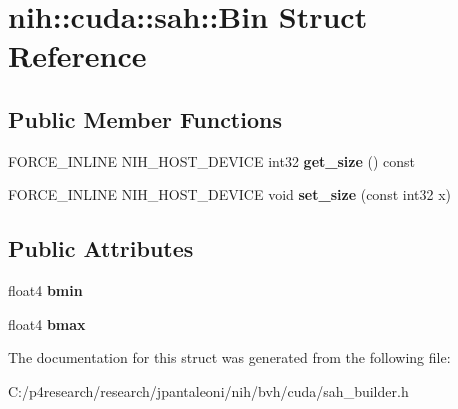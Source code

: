 \hypertarget{structnih_1_1cuda_1_1sah_1_1_bin}{
\section{nih\-:\-:cuda\-:\-:sah\-:\-:\-Bin \-Struct \-Reference}
\label{structnih_1_1cuda_1_1sah_1_1_bin}
}
\subsection*{\-Public \-Member \-Functions}
\begin{DoxyCompactItemize}
\item 
\hypertarget{structnih_1_1cuda_1_1sah_1_1_bin_aac3e8bb400330e915986fe215f2c0355}{
\-F\-O\-R\-C\-E\-\_\-\-I\-N\-L\-I\-N\-E \-N\-I\-H\-\_\-\-H\-O\-S\-T\-\_\-\-D\-E\-V\-I\-C\-E int32 {\bfseries get\-\_\-size} () const }
\label{structnih_1_1cuda_1_1sah_1_1_bin_aac3e8bb400330e915986fe215f2c0355}

\item 
\hypertarget{structnih_1_1cuda_1_1sah_1_1_bin_ac5a3567f77045dd99027256a9b1e157a}{
\-F\-O\-R\-C\-E\-\_\-\-I\-N\-L\-I\-N\-E \-N\-I\-H\-\_\-\-H\-O\-S\-T\-\_\-\-D\-E\-V\-I\-C\-E void {\bfseries set\-\_\-size} (const int32 x)}
\label{structnih_1_1cuda_1_1sah_1_1_bin_ac5a3567f77045dd99027256a9b1e157a}

\end{DoxyCompactItemize}
\subsection*{\-Public \-Attributes}
\begin{DoxyCompactItemize}
\item 
\hypertarget{structnih_1_1cuda_1_1sah_1_1_bin_a813bd78869dbaca446fc674e1b4a2372}{
float4 {\bfseries bmin}}
\label{structnih_1_1cuda_1_1sah_1_1_bin_a813bd78869dbaca446fc674e1b4a2372}

\item 
\hypertarget{structnih_1_1cuda_1_1sah_1_1_bin_ac7d0ca8b94ca9fda5f46f50ecf006ce7}{
float4 {\bfseries bmax}}
\label{structnih_1_1cuda_1_1sah_1_1_bin_ac7d0ca8b94ca9fda5f46f50ecf006ce7}

\end{DoxyCompactItemize}


\-The documentation for this struct was generated from the following file\-:\begin{DoxyCompactItemize}
\item 
\-C\-:/p4research/research/jpantaleoni/nih/bvh/cuda/sah\-\_\-builder.\-h\end{DoxyCompactItemize}
